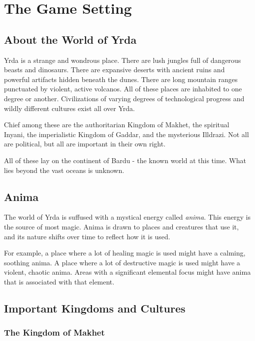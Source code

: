 \chapter{The Game Setting}

\begin{multicols}{2}

\section{About the World of Yrda}

Yrda is a strange and wondrous place. There are lush jungles full
of dangerous beasts and dinosaurs. There are expansive deserts with
ancient ruins and powerful artifacts hidden beneath the dunes. There
are long mountain ranges punctuated by violent, active volcanos.
All of these places are inhabited to one degree or another. Civilizations
of varying degrees of technological progress and wildly different
cultures exist all over Yrda.

Chief among these are the authoritarian Kingdom of Makhet, the
spiritual Inyani, the imperialistic Kingdom of Gaddar, and the
mysterious Illdrazi. Not all are political, but all are important
in their own right.

All of these lay on the continent of Bardu - the known world at this
time. What lies beyond the vast oceans is unknown.

\section{Anima}

The world of Yrda is suffused with a mystical energy called \textit{anima}. 
This energy is the source of most magic. Anima is drawn to places and creatures
that use it, and its nature shifts over time to reflect how it is used.

For example, a place where a lot of healing magic is used might have a
calming, soothing anima. A place where a lot of destructive magic is used
might have a violent, chaotic anima. Areas with a significant elemental
focus might have anima that is associated with that element.

\section{Important Kingdoms and Cultures}

\subsection{The Kingdom of Makhet}


\end{multicols}
